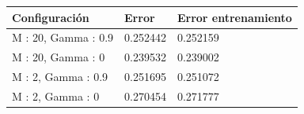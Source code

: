 \begin{tabular}{lll}
\toprule
Configuración & Error & Error entrenamiento \\
\midrule
M : 20, Gamma : 0.9 & 0.252442 & 0.252159 \\
M : 20, Gamma : 0 & 0.239532 & 0.239002 \\
M : 2, Gamma : 0.9 & 0.251695 & 0.251072 \\
M : 2, Gamma : 0 & 0.270454 & 0.271777 \\
\bottomrule
\end{tabular}
